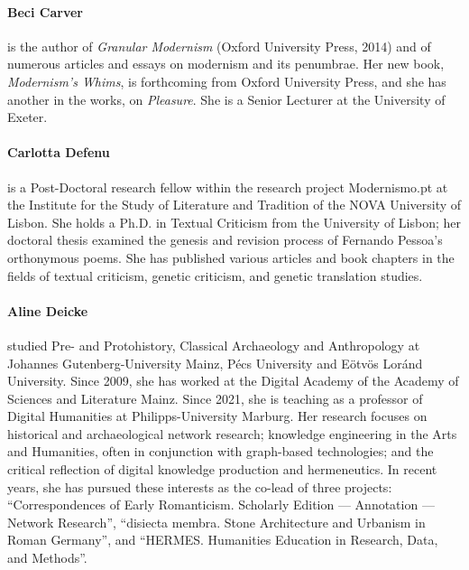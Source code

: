 \paragraph{Beci Carver} is the author of \emph{Granular Modernism} (Oxford
University Press, 2014) and of numerous articles and essays on modernism
and its penumbrae. Her new book, \emph{Modernism's Whims}, is
forthcoming from Oxford University Press, and she has another in the
works, on \emph{Pleasure}. She is a Senior Lecturer at the University of
Exeter.

\paragraph{Carlotta Defenu} is a Post-Doctoral research fellow within the research project Modernismo.pt at the Institute for the Study of Literature and Tradition of the NOVA University of Lisbon. She holds a Ph.D. in Textual Criticism from the University of Lisbon; her doctoral thesis examined the genesis and revision process of Fernando Pessoa’s orthonymous poems. She has published various articles and book chapters in the fields of textual criticism, genetic criticism, and genetic translation studies.

\paragraph{Aline Deicke} studied Pre- and Protohistory, Classical Archaeology and Anthropology at Johannes Gutenberg-University Mainz, Pécs University and
Eötvös Loránd University. Since 2009, she has worked at the Digital
Academy of the Academy of Sciences and Literature \textbar{} Mainz.
Since 2021, she is teaching as a professor of Digital Humanities at
Philipps-University Marburg. Her research focuses on historical and
archaeological network research; knowledge engineering in the Arts and
Humanities, often in conjunction with graph-based technologies; and the
critical reflection of digital knowledge production and hermeneutics. In
recent years, she has pursued these interests as the co-lead of three
projects: ``Correspondences of Early Romanticism. Scholarly Edition ---
Annotation --- Network Research'', ``disiecta membra. Stone Architecture
and Urbanism in Roman Germany'', and ``HERMES. Humanities Education in
Research, Data, and Methods''.

